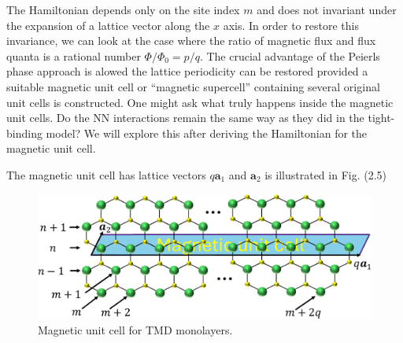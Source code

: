 \documentclass{report}
\begin{document}
The Hamiltonian depends only on the site index $m$ and does not invariant under the expansion of a lattice vector along the $x$ axis. In order to restore this invariance, we can look at the case where the ratio of magnetic flux and flux quanta is a rational number $\Phi / \Phi_{0} = p / q$. The crucial advantage of the Peierls phase approach is alowed the lattice periodicity can be restored provided a suitable magnetic unit cell or ``magnetic supercell'' containing several original unit cells is constructed. One might ask what truly happens inside the magnetic unit cells. Do the \ac{NN} interactions remain the same way as they did in the tight-binding model? We will explore this after deriving the Hamiltonian for the magnetic unit cell.

The magnetic unit cell has lattice vectors $q\mathbf{a}_{1}$ and $\mathbf{a}_{2}$ is illustrated in Fig. (2.5)
\begin{figure}[H]
	\centering
	\includegraphics[width=\linewidth]{pic/magneticUC_cut.pdf}
	\caption[Magnetic unit cell for TMD monolayers.]{\label{fig:Mag UC}Magnetic unit cell for TMD monolayers.}
\end{figure}
\end{document}
